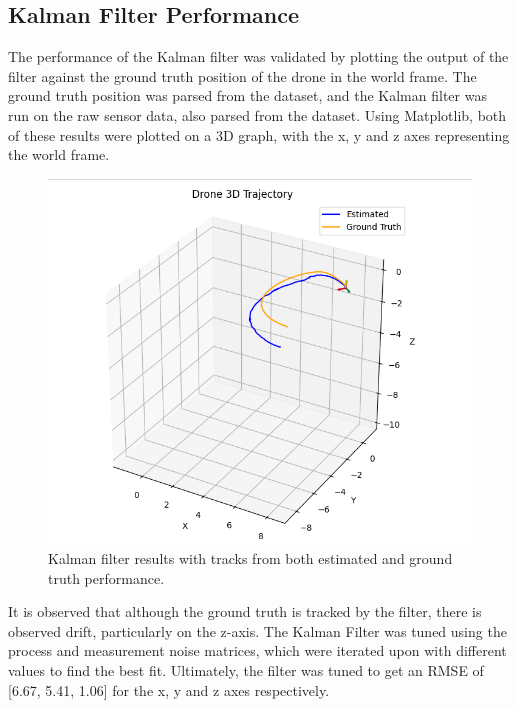 \documentclass[bare_jrnl_transmag]{subfiles}
\begin{document}
\subsection{Kalman Filter Performance}
The performance of the Kalman filter was validated by plotting the output of the filter against the ground truth position of the drone in the world frame. The ground truth position was parsed from the dataset, and the Kalman filter was run on the raw sensor data, also parsed from the dataset. Using Matplotlib, both of these results were plotted on a 3D graph, with the x, y and z axes representing the world frame.

\begin{figure}[H]
    \centering
    \includegraphics[width=0.8\linewidth]{figures/ekf_results.png}
    \caption{Kalman filter results with tracks from both estimated and ground truth performance.}
    \label{fig:kalman_results}
\end{figure}

It is observed that although the ground truth is tracked by the filter, there is observed drift, particularly on the z-axis. The Kalman Filter was tuned using the process and measurement noise matrices, which were iterated upon with different values to find the best fit. Ultimately, the filter was tuned to get an RMSE of [6.67, 5.41, 1.06] for the x, y and z axes respectively.
\end{document}
